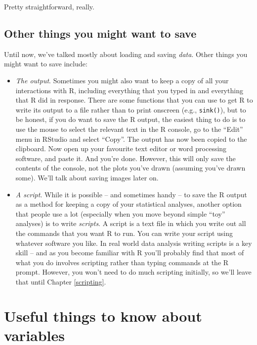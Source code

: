 \documentclass[
]{book}
\begin{document}
Pretty straightforward, really.

\hypertarget{other-things-you-might-want-to-save}{%
\subsection{Other things you might want to save}\label{other-things-you-might-want-to-save}}

Until now, we've talked mostly about loading and saving \emph{data}. Other things you might want to save include:

\begin{itemize}
\item
  \emph{The output}. Sometimes you might also want to keep a copy of all your interactions with R, including everything that you typed in and everything that R did in response. There are some functions that you can use to get R to write its output to a file rather than to print onscreen (e.g., \texttt{sink()}), but to be honest, if you do want to save the R output, the easiest thing to do is to use the mouse to select the relevant text in the R console, go to the ``Edit'' menu in RStudio and select ``Copy''. The output has now been copied to the clipboard. Now open up your favourite text editor or word processing software, and paste it. And you're done. However, this will only save the contents of the console, not the plots you've drawn (assuming you've drawn some). We'll talk about saving images later on.
\item
  \emph{A script}. While it is possible -- and sometimes handy -- to save the R output as a method for keeping a copy of your statistical analyses, another option that people use a lot (especially when you move beyond simple ``toy'' analyses) is to write \emph{scripts}. A script is a text file in which you write out all the commands that you want R to run. You can write your script using whatever software you like. In real world data analysis writing scripts is a key skill -- and as you become familiar with R you'll probably find that most of what you do involves scripting rather than typing commands at the R prompt. However, you won't need to do much scripting initially, so we'll leave that until Chapter \ref{scripting}.
\end{itemize}

\hypertarget{useful}{%
\section{Useful things to know about variables}\label{useful}}
\end{document}

